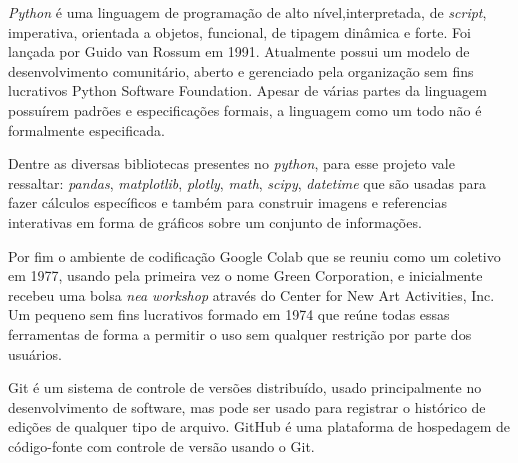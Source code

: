 \textit{Python} é uma linguagem de programação de alto nível,interpretada, de \textit{script}, imperativa, orientada a objetos, funcional, de tipagem dinâmica e forte. Foi lançada por Guido van Rossum em 1991. Atualmente possui um modelo de desenvolvimento comunitário, aberto e gerenciado pela organização sem fins lucrativos Python Software Foundation. Apesar de várias partes da linguagem possuírem padrões e especificações formais, a linguagem como um todo não é formalmente especificada.

Dentre as diversas bibliotecas presentes no \textit{python}, para esse projeto vale ressaltar: \textit{pandas}, \textit{matplotlib}, \textit{plotly}, \textit{math}, \textit{scipy}, \textit{datetime} que são usadas para fazer cálculos específicos e também para construir imagens e referencias interativas em forma de gráficos sobre um conjunto de informações.

Por fim o ambiente de codificação Google Colab que se reuniu como um coletivo em 1977, usando pela primeira vez o nome Green Corporation, e inicialmente recebeu uma bolsa \textit{nea workshop} através do Center for New Art Activities, Inc. Um pequeno sem fins lucrativos formado em 1974 que reúne todas essas ferramentas de forma a permitir o uso sem qualquer restrição por parte dos usuários.

Git é um sistema de controle de versões distribuído, usado principalmente no desenvolvimento de software, mas pode ser usado para registrar o histórico de edições de qualquer tipo de arquivo. GitHub é uma plataforma de hospedagem de código-fonte com controle de versão usando o Git.